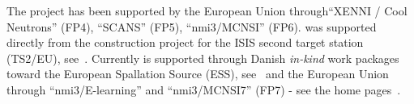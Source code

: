 The \MCS project has been supported by the European Union
through``XENNI / Cool Neutrons'' (FP4), ``SCANS'' (FP5),
``nmi3/MCNSI'' (FP6). \MCS was supported directly from the construction project for the ISIS second
target station (TS2/EU), see~\cite{ts2_webpage}. Currently \MCS is 
supported through Danish \emph{in-kind} work packages toward the
European Spallation Source (ESS), see~\cite{ess_webpage} and the
European Union through ``nmi3/E-learning'' and ``nmi3/MCNSI7'' (FP7) - see
the home pages~\cite{nmi3_webpage,mcnsi_webpage}.

